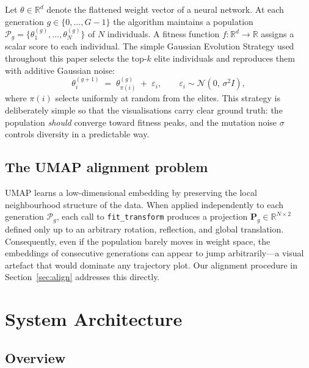 \documentclass{article}
\begin{document}
Let $\theta \in \mathbb{R}^d$ denote the flattened weight vector of a neural
network.
At each generation $g \in \{0,\ldots,G-1\}$ the algorithm maintains a
population $\mathcal{P}_g = \{\theta^{(g)}_1, \ldots, \theta^{(g)}_N\}$ of
$N$ individuals.
A fitness function $f: \mathbb{R}^d \to \mathbb{R}$ assigns a scalar score
to each individual.
The simple Gaussian Evolution Strategy used throughout this paper selects
the top-$k$ elite individuals and reproduces them with additive Gaussian noise:
\begin{equation}
  \theta^{(g+1)}_i \;=\; \theta^{(g)}_{\pi(i)} \;+\; \varepsilon_i,
  \qquad \varepsilon_i \sim \mathcal{N}(0,\,\sigma^2 I),
  \label{eq:es}
\end{equation}
where $\pi(i)$ selects uniformly at random from the elites.
This strategy is deliberately simple so that the visualisations carry clear
ground truth: the population \emph{should} converge toward fitness peaks, and
the mutation noise $\sigma$ controls diversity in a predictable way.

\subsection{The UMAP alignment problem}

UMAP \citep{mcinnes2018umap} learns a low-dimensional embedding by preserving
the local neighbourhood structure of the data.
When applied independently to each generation $\mathcal{P}_g$, each call to
\texttt{fit\_transform} produces a projection
$\mathbf{P}_g \in \mathbb{R}^{N \times 2}$ defined only up to an arbitrary
rotation, reflection, and global translation.
Consequently, even if the population barely moves in weight space, the
embeddings of consecutive generations can appear to jump arbitrarily---a
visual artefact that would dominate any trajectory plot.
Our alignment procedure in Section~\ref{sec:align} addresses this directly.


\section{System Architecture}
\label{sec:system}

\subsection{Overview}
\end{document}
